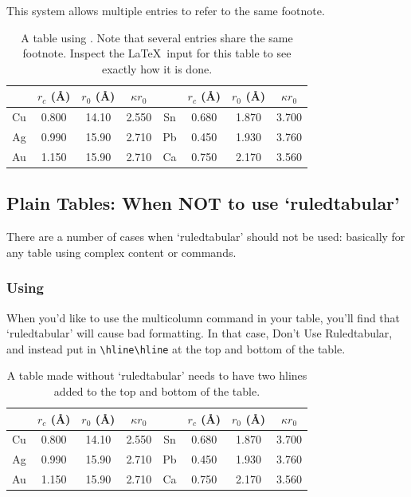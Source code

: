 \documentclass[reprint]{JASA}
\begin{document}
This system allows
multiple entries to refer to the same
footnote.   


\begin{table}[ht]
\caption{\label{tab:table1}A table using {\tt\string{}}.
Note that several entries share the same
footnote. Inspect the \LaTeX\ input for this table to see
exactly how it is done.}

\begin{ruledtabular}
\begin{tabular}{cccccccc}
 &$r_c$ (\AA)\footnotemark[1]&$r_0$ (\AA)&$\kappa r_0$&
 &$r_c$ (\AA) &$r_0$ (\AA)&$\kappa r_0$\\
\hline
Cu& 0.800 & 14.10 & 2.550 &Sn\footnotemark[1]
& 0.680 & 1.870 & 3.700 \\
Ag& 0.990 & 15.90 & 2.710 &Pb\footnotemark[2]
& 0.450 & 1.930 & 3.760 \\
Au& 1.150 & 15.90 & 2.710 &Ca\footnotemark[3]
& 0.750 & 2.170 & 3.560 
\end{tabular}
\end{ruledtabular}
\end{table}

\subsection{Plain Tables: When NOT to use `ruledtabular'}
There are a number of cases when `ruledtabular' should not
be used: basically for any table using complex content or 
commands.

\subsubsection{Using {\tt\string\multicolumn}}
When you'd like to use the multicolumn command in your
table, you'll find that `ruledtabular' will cause bad
formatting. In that case, Don't Use Ruledtabular, and
instead put in \verb+\hline\hline+ at the top and bottom of
the table. 


\begin{table}[ht]
\caption{A table made without `ruledtabular' needs to have two hlines
added to the top and bottom of the table.}
\vskip3pt
\begin{tabular}{cccccccc}
\hline\hline
 &$r_c$ (\AA)\footnotemark[1]&$r_0$ (\AA)&$\kappa r_0$&
 &$r_c$ (\AA) &$r_0$ (\AA)&$\kappa r_0$\\
\hline
Cu& 0.800 & 14.10 & 2.550 &Sn\footnotemark[1]
& 0.680 & 1.870 & 3.700 \\
Ag& 0.990 & 15.90 & 2.710 &Pb\footnotemark[2]
& 0.450 & 1.930 & 3.760 \\
Au& 1.150 & 15.90 & 2.710 &Ca\footnotemark[3]
& 0.750 & 2.170 & 3.560\\
\hline\hline
\end{tabular}
\end{table}
\end{document}
